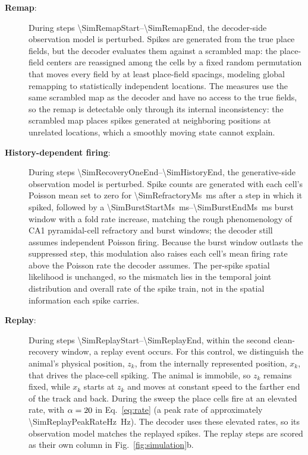 \documentclass[12pt]{article}
\begin{document}
\begin{description}
    \item[\textbf{Remap}:] During steps \num{\SimRemapStart}--\num{\SimRemapEnd}, the decoder-side observation model is perturbed. Spikes are generated from the true place fields, but the decoder evaluates them against a scrambled map: the \SimNPlaceCellsWord{} place-field centers are reassigned among the cells by a fixed random permutation that moves every field by at least \SimRemapDisplacementWord{} place-field spacings, modeling global remapping to statistically independent locations. The measures use the same scrambled map as the decoder and have no access to the true fields, so the remap is detectable only through its internal inconsistency: the scrambled map places spikes generated at neighboring positions at unrelated locations, which a smoothly moving state cannot explain.
    \item[\textbf{History-dependent firing}:] During steps \num{\SimRecoveryOneEnd}--\num{\SimHistoryEnd}, the generative-side observation model is perturbed. Spike counts are generated with each cell's Poisson mean set to zero for \SI{\SimRefractoryMs}{ms} after a step in which it spiked, followed by a \SI{\SimBurstStartMs}{ms}--\SI{\SimBurstEndMs}{ms} burst window with a \SimBurstFactorWord{}fold rate increase, matching the rough phenomenology of CA1 pyramidal-cell refractory and burst windows; the decoder still assumes independent Poisson firing. Because the burst window outlasts the suppressed step, this modulation also raises each cell's mean firing rate above the Poisson rate the decoder assumes. The per-spike spatial likelihood is unchanged, so the mismatch lies in the temporal joint distribution and overall rate of the spike train, not in the spatial information each spike carries.
    \item[\textbf{Replay}:] During steps \num{\SimReplayStart}--\num{\SimReplayEnd}, within the second clean-recovery window, a replay event occurs. For this control, we distinguish the animal's physical position, $z_k$, from the internally represented position, $x_k$, that drives the place-cell spiking. The animal is immobile, so $z_k$ remains fixed, while $x_k$ starts at $z_k$ and moves at constant speed to the farther end of the track and back. During the sweep the place cells fire at an elevated rate, with $\alpha = 20$ in Eq.~\eqref{eq:rate} (a peak rate of approximately \SI{\SimReplayPeakRateHz}{Hz}). The decoder uses these elevated rates, so its observation model matches the replayed spikes. The replay steps are scored as their own column in Fig.~\ref{fig:simulation}b.

\end{description}
\end{document}
